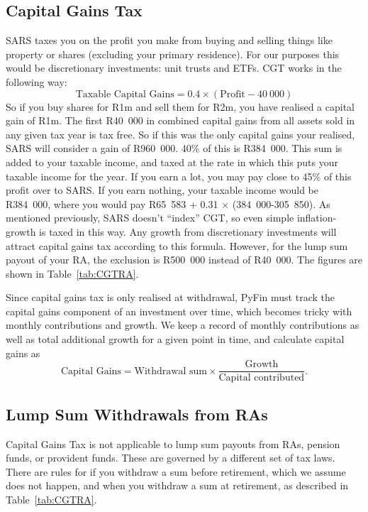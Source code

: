 \documentclass[a4paper, justified]{tufte-handout}
\begin{document}
\subsection{Capital Gains Tax}
SARS taxes you on the profit you make from buying and selling things like property or shares (excluding your primary residence). For our purposes this would be discretionary investments: unit trusts and ETFs.
CGT works in the following way:
\begin{equation} \label{eq:CGT}
\textrm{Taxable Capital Gains} = 0.4\times(\textrm{Profit} - 40~000)
\end{equation}
So if you buy shares for R1m and sell them for R2m, you have realised a capital gain of R1m. The first R40~000 in combined capital gains from all assets sold in any given tax year is tax free. So if this was the only capital gains your realised, SARS will consider a gain of R960~000. 40\% of this is R384~000. This sum is added to your taxable income, and taxed at the rate in which this puts your taxable income for the year. If you earn a lot, you may pay close to 45\% of this profit over to SARS. If you earn nothing, your taxable income would be R384~000, where you would pay R65~583 + 0.31 $\times$ (384~000-305~850). As mentioned previously, SARS doesn't ``index'' CGT, so even simple inflation-growth is taxed in this way. Any growth from discretionary investments will attract capital gains tax according to this formula. However, for the lump sum payout of your RA, the exclusion is R500~000 instead of R40~000. The figures are shown in Table~\ref{tab:CGTRA}.

Since capital gains tax is only realised at withdrawal, PyFin must track the capital gains component of an investment over time, which becomes tricky with monthly contributions and growth. We keep a record of monthly contributions as well as total additional growth for a given point in time, and calculate capital gains as
\begin{equation}
\textrm{Capital Gains} = \textrm{Withdrawal sum}\times\frac{\textrm{Growth}}{\textrm{Capital contributed}}.
\end{equation}

\subsection{Lump Sum Withdrawals from RAs}
Capital Gains Tax is not applicable to lump sum payouts from RAs, pension funds, or provident funds. These are governed by a different set of tax laws. There are rules for if you withdraw a sum before retirement, which we assume does not happen, and when you withdraw a sum at retirement, as described in Table~\ref{tab:CGTRA}.
\end{document}
